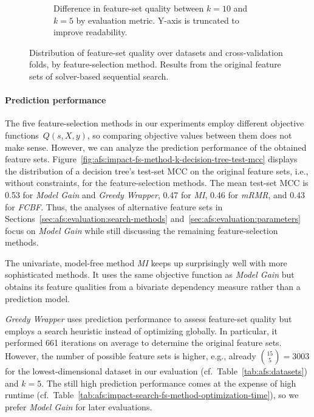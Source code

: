 \documentclass{article}
\theoremstyle{definition}
\begin{document}
\begin{figure}[t]
\begin{subfigure}[t]{0.48\textwidth}
		\caption{
			Difference in feature-set quality between $k=10$ and $k=5$ by evaluation metric.
			Y-axis is truncated to improve readability.
		}
		\label{fig:afs:impact-fs-method-k-metric-diff}
	\end{subfigure}
	\caption{
		Distribution of feature-set quality over datasets and cross-validation folds, by feature-selection method.
		Results from the original feature sets of solver-based sequential search.
	}
	\label{fig:afs:impact-fs-method-k-quality}
\end{figure}

\paragraph{Prediction performance}

The five feature-selection methods in our experiments employ different objective functions~$Q(s,X,y)$, so comparing objective values between them does not make sense.
However, we can analyze the prediction performance of the obtained feature sets.
Figure~\ref{fig:afs:impact-fs-method-k-decision-tree-test-mcc} displays the distribution of a decision tree's test-set MCC on the original feature sets, i.e., without constraints, for the feature-selection methods.
The mean test-set MCC is 0.53 for \emph{Model Gain} and \emph{Greedy Wrapper}, 0.47 for \emph{MI}, 0.46 for \emph{mRMR}, and 0.43 for \emph{FCBF}.
Thus, the analyses of alternative feature sets in Sections~\ref{sec:afs:evaluation:search-methods} and~\ref{sec:afs:evaluation:parameters} focus on \emph{Model Gain} while still discussing the remaining feature-selection methods.

The univariate, model-free method \emph{MI} keeps up surprisingly well with more sophisticated methods.
It uses the same objective function as \emph{Model Gain} but obtains its feature qualities from a bivariate dependency measure rather than a prediction model.

\emph{Greedy Wrapper} uses prediction performance to assess feature-set quality but employs a search heuristic instead of optimizing globally.
In particular, it performed 661 iterations on average to determine the original feature sets.
However, the number of possible feature sets is higher, e.g., already $\binom{15}{5} = 3003$ for the lowest-dimensional dataset in our evaluation (cf.~Table~\ref{tab:afs:datasets}) and $k=5$.
The still high prediction performance comes at the expense of high runtime (cf.~Table~\ref{tab:afs:impact-search-fs-method-optimization-time}), so we prefer \emph{Model Gain} for later evaluations.
\end{document}
